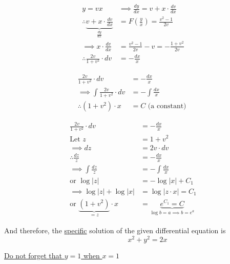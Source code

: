 \documentclass[14pt,fleqn]{extarticle}
\begin{document}
\begin{question}
\begin{step}
	\begin{align}
y = vx &\implies \frac{dy}{dx} = v + x\cdot\frac{dv}{dx} \\[5pt]
\therefore  \underbrace{v + x\cdot\frac{dv}{dx}}_{\frac{dy}{dx}} &= F\left(\frac{y}{x}\right) = \frac{v^2-1}{2v} \\
\implies x\cdot\frac{dv}{dx} &= \frac{v^2-1}{2v}- v = -\frac{1+v^2}{2v} \\
\therefore \frac{2v}{1+v^2}\cdot dv &= -\frac{dx}{x} 
\end{align} 
\end{step}
\begin{step}
	\begin{options}
		\correct
		
		\begin{align}
	\frac{2v}{1+v^2} \cdot dv &= -\frac{dx}{x} \\ 
	\implies \int \frac{2v}{1+v^2} \cdot dv &= -\int \frac{dx}{x} \\[5pt]
	\therefore \left(1+v^2 \right)\cdot x &= C \text{ (a constant) }
\end{align}

	\end{options}
	\reason

	\begin{align}
\frac{2v}{1+v^2}\cdot dv &= -\frac{dx}{x} \\
\text{Let } z &= 1+v^2\\
\implies dz &= 2v\cdot dv \\[5pt]
\therefore \frac{dz}{z} &= -\frac{dx}{x}\\
\implies \int\frac{dz}{z} &= -\int\frac{dx}{x} \\
\text{or } \log \vert z\vert &= -\log\vert x\vert + C_1 \\
\implies \log\vert z\vert + \log\vert x\vert &= \log\vert z\cdot x\vert = C_1 \\
\text{or } \underbrace{(1+v^2)}_{ = z}\cdot x &= \underbrace{e^{C_1} = C}_{\log b = a\implies b = e^a}
\end{align} 
\end{step}
\begin{step}
	\begin{options}
		\correct
		
		And therefore, the \underline{specific} solution of the given differential equation is  
		\[\qquad\qquad x^2 + y^2 = 2x \]

	\end{options}
	\reason

\underline{Do not forget that $y=1$ when $x=1$}


\end{step}
\end{question}
\end{document}
